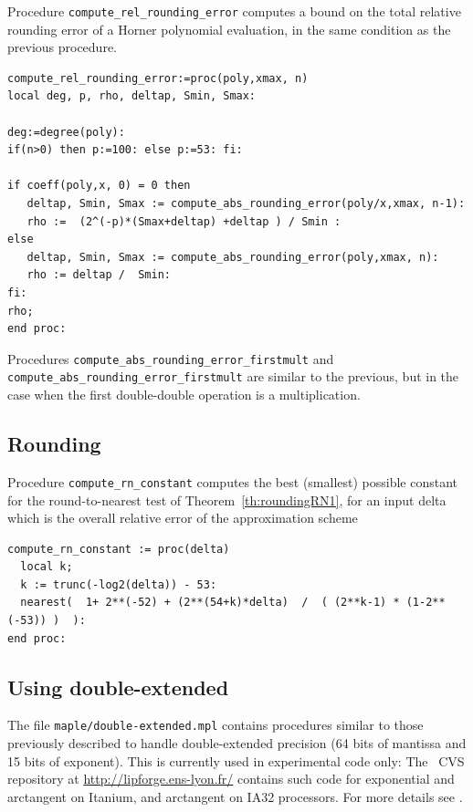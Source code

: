 Procedure \texttt{compute\_rel\_rounding\_error} computes a bound on
the total relative rounding error of a Horner polynomial evaluation,
in the same condition as the previous procedure.

\begin{lstlisting}[caption={compute\_abs\_rounding\_error},firstnumber=1]
compute_rel_rounding_error:=proc(poly,xmax, n)
local deg, p, rho, deltap, Smin, Smax:

deg:=degree(poly):
if(n>0) then p:=100: else p:=53: fi: 

if coeff(poly,x, 0) = 0 then
   deltap, Smin, Smax := compute_abs_rounding_error(poly/x,xmax, n-1):
   rho :=  (2^(-p)*(Smax+deltap) +deltap ) / Smin :
else
   deltap, Smin, Smax := compute_abs_rounding_error(poly,xmax, n):
   rho := deltap /  Smin:
fi:
rho;
end proc:
\end{lstlisting}
\vspace{0.5cm}

Procedures \texttt{compute\_abs\_rounding\_error\_firstmult} and
\texttt{compute\_abs\_rounding\_error\_firstmult} are similar to the
previous, but in the case when the first double-double operation is a
multiplication.



\subsection{Rounding}

Procedure \texttt{compute\_rn\_constant} computes the best (smallest)
possible constant for the round-to-nearest test of
Theorem~\ref{th:roundingRN1}, for an input delta which is the overall
relative error of the approximation scheme

\begin{lstlisting}[caption={compute\_rn\_constant},firstnumber=1]
compute_rn_constant := proc(delta)
  local k;
  k := trunc(-log2(delta)) - 53: 
  nearest(  1+ 2**(-52) + (2**(54+k)*delta)  /  ( (2**k-1) * (1-2**(-53)) )  ):
end proc:
\end{lstlisting}
\vspace{0.5cm}



\subsection{Using double-extended}

The file \texttt{maple/double-extended.mpl} contains procedures
similar to those previously described to handle double-extended
precision (64 bits of mantissa and 15 bits of exponent). This is
currently used in experimental code only: The \crlibm\ CVS repository
at \url{http://lipforge.ens-lyon.fr/} contains such code for
exponential and arctangent on Itanium, and arctangent on IA32
processors. For more details see \cite{DinDefLau2004LIP,DinGast2005}.
